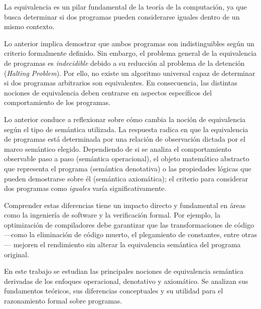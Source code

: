 La equivalencia es un pilar fundamental de la teoría de la computación, ya que busca determinar si dos programas pueden considerarse iguales dentro de un mismo contexto. 

Lo anterior implica demostrar que ambos programas son indistinguibles según un criterio formalmente definido. Sin embargo, el problema general de la equivalencia de programas es \emph{indecidible} debido a su reducción al problema de la detención (\textit{Halting Problem}). Por ello, no existe un algoritmo universal capaz de determinar si dos programas arbitrarios son equivalentes. En consecuencia, las distintas nociones de equivalencia deben centrarse en aspectos específicos del comportamiento de los programas.

Lo anterior conduce a reflexionar sobre cómo cambia la noción de equivalencia según el tipo de semántica utilizada. La respuesta radica en que la equivalencia de programas está determinada por una relación de observación dictada por el marco semántico elegido. Dependiendo de si se analiza el comportamiento observable paso a paso (semántica operacional), el objeto matemático abstracto que representa el programa (semántica denotativa) o las propiedades lógicas que pueden demostrarse sobre él (semántica axiomática); el criterio para considerar dos programas como \textit{iguales} varía significativamente.

Comprender estas diferencias tiene un impacto directo y fundamental en áreas como la ingeniería de software y la verificación formal. Por ejemplo, la optimización de compiladores debe garantizar que las transformaciones de código —como la eliminación de código muerto, el plegamiento de constantes, entre otras— mejoren el rendimiento sin alterar la equivalencia semántica del programa original.

En este trabajo se estudian las principales nociones de equivalencia semántica derivadas de los enfoques operacional, denotativo y axiomático. Se analizan sus fundamentos teóricos, sus diferencias conceptuales y su utilidad para el razonamiento formal sobre programas.